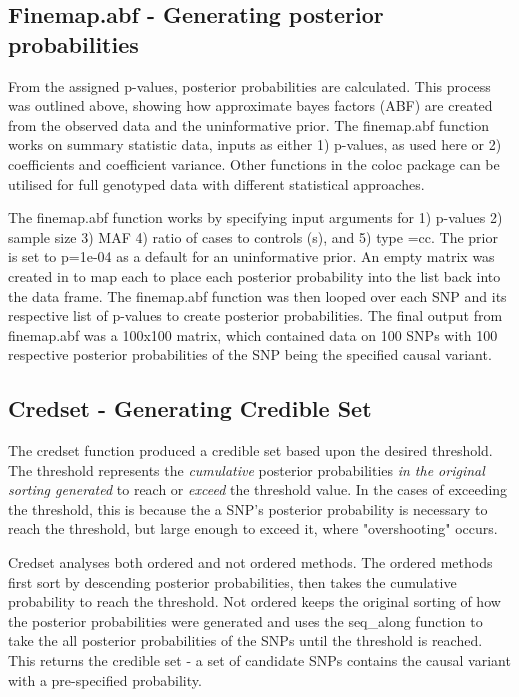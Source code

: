 \subsection{Finemap.abf - Generating posterior probabilities} 
From the assigned p-values, posterior probabilities are calculated. This process was outlined above, showing how approximate bayes factors (ABF) are created from the observed data and the uninformative prior. The finemap.abf function works on summary statistic data, inputs as either 1) p-values, as used here or 2) coefficients and coefficient variance. Other functions in the coloc package can be utilised for full genotyped data with different statistical approaches. 

The finemap.abf function works by specifying input arguments for 1) p-values 2) sample size 3) MAF 4) ratio of cases to controls (s), and 5) type =cc. The prior is set to p=1e-04 as a default for an uninformative prior. An empty matrix was created in to map each to place each posterior probability into the list back into the data frame. The finemap.abf function was then looped over each SNP and its respective list of p-values to create posterior probabilities. The final output from finemap.abf was a 100x100 matrix, which contained data on 100 SNPs with 100 respective posterior probabilities of the SNP being the specified causal variant. 

\subsection{Credset - Generating Credible Set}
The credset function produced a credible set based upon the desired threshold. The threshold represents the \textit{cumulative} posterior probabilities \textit{in the original sorting generated} to reach or \textit{exceed} the threshold value. In the cases of exceeding the threshold, this is because the a SNP's posterior probability is necessary to reach the threshold, but large enough to exceed it, where "overshooting" occurs. 

Credset analyses both ordered and not ordered methods. The ordered methods first sort by descending posterior probabilities, then takes the cumulative probability to reach the threshold. Not ordered keeps the original sorting of how the posterior probabilities were generated and uses the seq\_along function to take the all posterior probabilities of the SNPs until the threshold is reached. This returns the credible set - a set of candidate SNPs  contains the causal variant with a pre-specified probability. 

